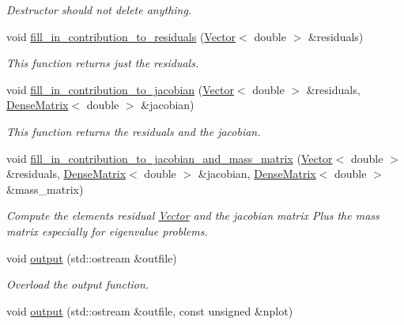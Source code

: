 \begin{DoxyCompactItemize}
\begin{DoxyCompactList}\small\item\em Destructor should not delete anything. \end{DoxyCompactList}\item 
void \hyperlink{classoomph_1_1PolarStressIntegralElement_a15e709f5a2763bbc865f9c3060aebca0}{fill\+\_\+in\+\_\+contribution\+\_\+to\+\_\+residuals} (\hyperlink{classoomph_1_1Vector}{Vector}$<$ double $>$ \&residuals)
\begin{DoxyCompactList}\small\item\em This function returns just the residuals. \end{DoxyCompactList}\item 
void \hyperlink{classoomph_1_1PolarStressIntegralElement_a6d69d508578b03a2f219e49089f5323c}{fill\+\_\+in\+\_\+contribution\+\_\+to\+\_\+jacobian} (\hyperlink{classoomph_1_1Vector}{Vector}$<$ double $>$ \&residuals, \hyperlink{classoomph_1_1DenseMatrix}{Dense\+Matrix}$<$ double $>$ \&jacobian)
\begin{DoxyCompactList}\small\item\em This function returns the residuals and the jacobian. \end{DoxyCompactList}\item 
void \hyperlink{classoomph_1_1PolarStressIntegralElement_a2e8896b4e1e698caa3460dd41da55cb8}{fill\+\_\+in\+\_\+contribution\+\_\+to\+\_\+jacobian\+\_\+and\+\_\+mass\+\_\+matrix} (\hyperlink{classoomph_1_1Vector}{Vector}$<$ double $>$ \&residuals, \hyperlink{classoomph_1_1DenseMatrix}{Dense\+Matrix}$<$ double $>$ \&jacobian, \hyperlink{classoomph_1_1DenseMatrix}{Dense\+Matrix}$<$ double $>$ \&mass\+\_\+matrix)
\begin{DoxyCompactList}\small\item\em Compute the element\textquotesingle{}s residual \hyperlink{classoomph_1_1Vector}{Vector} and the jacobian matrix Plus the mass matrix especially for eigenvalue problems. \end{DoxyCompactList}\item 
void \hyperlink{classoomph_1_1PolarStressIntegralElement_a02bac6dcd43010bafb383d420502af8d}{output} (std\+::ostream \&outfile)
\begin{DoxyCompactList}\small\item\em Overload the output function. \end{DoxyCompactList}\item 
void \hyperlink{classoomph_1_1PolarStressIntegralElement_ab142fd67c65361764d9496e6ec0363a1}{output} (std\+::ostream \&outfile, const unsigned \&nplot)

\end{DoxyCompactItemize}
